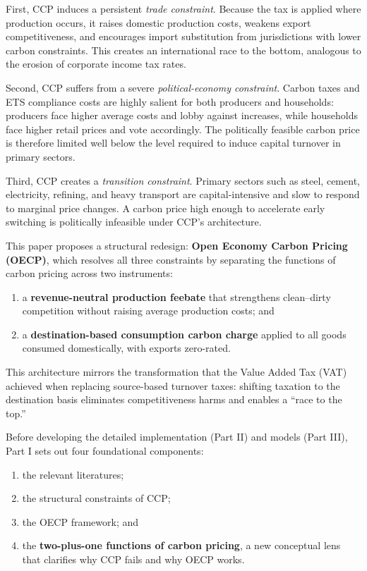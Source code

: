 \documentclass[12pt]{article}
\begin{document}
First, CCP induces a persistent \textit{trade constraint}. 
Because the tax is applied where production occurs, it raises domestic production 
costs, weakens export competitiveness, and encourages import substitution 
from jurisdictions with lower carbon constraints. This creates an international 
race to the bottom, analogous to the erosion of corporate income tax rates.

Second, CCP suffers from a severe \textit{political-economy constraint}. 
Carbon taxes and ETS compliance costs are highly salient for both producers and 
households: producers face higher average costs and lobby against increases, 
while households face higher retail prices and vote accordingly.
The politically feasible carbon price is therefore limited well below 
the level required to induce capital turnover in primary sectors.

Third, CCP creates a \textit{transition constraint}. 
Primary sectors such as steel, cement, electricity, refining, and heavy transport 
are capital-intensive and slow to respond to marginal price changes.
A carbon price high enough to accelerate early switching 
is politically infeasible under CCP’s architecture.

This paper proposes a structural redesign: 
\textbf{Open Economy Carbon Pricing (OECP)},  
which resolves all three constraints by separating the 
functions of carbon pricing across two instruments:
\begin{enumerate}
    \item a \textbf{revenue-neutral production feebate} that strengthens 
    clean–dirty competition without raising average production costs; and
    \item a \textbf{destination-based consumption carbon charge} applied to all 
    goods consumed domestically, with exports zero-rated.
\end{enumerate}

This architecture mirrors the transformation that the Value Added Tax (VAT) 
achieved when replacing source-based turnover taxes: shifting taxation to the 
destination basis eliminates competitiveness harms and enables a ``race to the top.''  

Before developing the detailed implementation (Part II) and models (Part III),  
Part I sets out four foundational components:
\begin{enumerate}
    \item the relevant literatures;  
    \item the structural constraints of CCP;  
    \item the OECP framework; and  
    \item the \textbf{two-plus-one functions of carbon pricing}, 
          a new conceptual lens that clarifies why CCP fails and why OECP works.
\end{enumerate}
\end{document}
